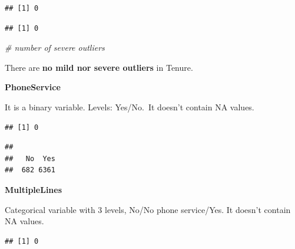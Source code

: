 \documentclass[
  twoside]{article}
\newenvironment{Shaded}{\begin{snugshade}}{\end{snugshade}}
\newcommand{\CommentTok}[1]{\textcolor[rgb]{0.56,0.35,0.01}{\textit{#1}}}
\newcommand{\DecValTok}[1]{\textcolor[rgb]{0.00,0.00,0.81}{#1}}
\newcommand{\FunctionTok}[1]{\textcolor[rgb]{0.00,0.00,0.00}{#1}}
\newcommand{\NormalTok}[1]{#1}
\newcommand{\OtherTok}[1]{\textcolor[rgb]{0.56,0.35,0.01}{#1}}
\newcommand{\SpecialCharTok}[1]{\textcolor[rgb]{0.00,0.00,0.00}{#1}}
\newcommand{\StringTok}[1]{\textcolor[rgb]{0.31,0.60,0.02}{#1}}
\begin{document}
\begin{verbatim}
## [1] 0
\end{verbatim}

\begin{Shaded}
\end{Shaded}

\begin{verbatim}
## [1] 0
\end{verbatim}

\begin{Shaded}
\begin{Highlighting}[]
\CommentTok{\# number of severe outliers}
\end{Highlighting}
\end{Shaded}

There are \textbf{no mild nor severe outliers} in Tenure.

\textbf{PhoneService}

It is a binary variable. Levels: Yes/No.~It doesn't contain NA values.

\begin{verbatim}
## [1] 0
\end{verbatim}

\begin{verbatim}
## 
##   No  Yes 
##  682 6361
\end{verbatim}

\textbf{MultipleLines}

Categorical variable with 3 levels, No/No phone service/Yes. It doesn't
contain NA values.

\begin{verbatim}
## [1] 0
\end{verbatim}
\end{document}
